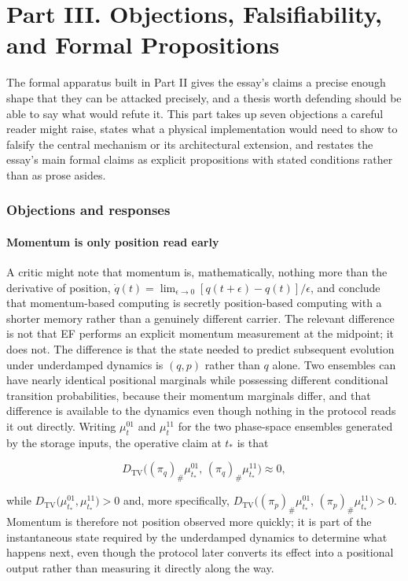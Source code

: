 \documentclass[11pt]{article}
\begin{document}
\part*{Part III. Objections, Falsifiability, and Formal Propositions}

The formal apparatus built in Part II gives the essay's claims a precise enough shape that they can be attacked precisely, and a thesis worth defending should be able to say what would refute it. This part takes up seven objections a careful reader might raise, states what a physical implementation would need to show to falsify the central mechanism or its architectural extension, and restates the essay's main formal claims as explicit propositions with stated conditions rather than as prose asides.

\section{Objections and responses}

\subsection{Momentum is only position read early}

A critic might note that momentum is, mathematically, nothing more than the derivative of position, $\dot q(t) = \lim_{\epsilon\to0}[q(t+\epsilon)-q(t)]/\epsilon$, and conclude that momentum-based computing is secretly position-based computing with a shorter memory rather than a genuinely different carrier. The relevant difference is not that EF performs an explicit momentum measurement at the midpoint; it does not. The difference is that the state needed to predict subsequent evolution under underdamped dynamics is $(q,p)$ rather than $q$ alone. Two ensembles can have nearly identical positional marginals while possessing different conditional transition probabilities, because their momentum marginals differ, and that difference is available to the dynamics even though nothing in the protocol reads it out directly. Writing $\mu_t^{01}$ and $\mu_t^{11}$ for the two phase-space ensembles generated by the storage inputs, the operative claim at $t_\ast$ is that

\[
D_{\mathrm{TV}}\bigl((\pi_q)_\#\mu_{t_\ast}^{01},\,(\pi_q)_\#\mu_{t_\ast}^{11}\bigr) \approx 0,
\]

while $D_{\mathrm{TV}}\bigl(\mu_{t_\ast}^{01},\mu_{t_\ast}^{11}\bigr)>0$ and, more specifically, $D_{\mathrm{TV}}\bigl((\pi_p)_\#\mu_{t_\ast}^{01},\,(\pi_p)_\#\mu_{t_\ast}^{11}\bigr)>0$. Momentum is therefore not position observed more quickly; it is part of the instantaneous state required by the underdamped dynamics to determine what happens next, even though the protocol later converts its effect into a positional output rather than measuring it directly along the way.
\end{document}
